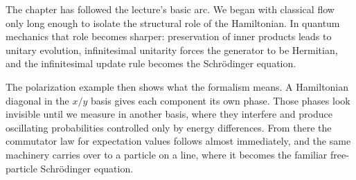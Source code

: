 The chapter has followed the lecture's basic arc. We began with classical flow only long enough to isolate the structural role of the Hamiltonian. In quantum mechanics that role becomes sharper: preservation of inner products leads to unitary evolution, infinitesimal unitarity forces the generator to be Hermitian, and the infinitesimal update rule becomes the Schr\"odinger equation.

The polarization example then shows what the formalism means. A Hamiltonian diagonal in the $x/y$ basis gives each component its own phase. Those phases look invisible until we measure in another basis, where they interfere and produce oscillating probabilities controlled only by energy differences. From there the commutator law for expectation values follows almost immediately, and the same machinery carries over to a particle on a line, where it becomes the familiar free-particle Schr\"odinger equation.